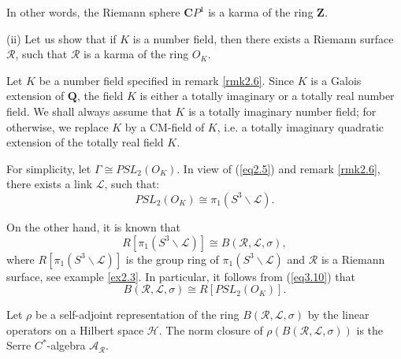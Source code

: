 \documentclass[10pt, reqno]{amsart}
\theoremstyle{definition}
\theoremstyle{remark}
\numberwithin{equation}{section}
\begin{document}
In other words, the Riemann sphere $\mathbf{C}P^1$ is a karma of the ring $\mathbf{Z}$. 






\bigskip
(ii)  Let us show that if $K$ is a number field, then there exists a Riemann surface $\mathscr{R}$, 
such that $\mathscr{R}$ is a karma of the ring $O_K$. 

Let $K$ be a number field specified in remark \ref{rmk2.6}.  Since $K$ is a Galois extension of $\mathbf{Q}$,
the field $K$ is either a totally imaginary or a totally real number field. We shall always assume that $K$ is a totally
imaginary number field;  for otherwise, we replace $K$ by a CM-field of $K$, i.e. a totally imaginary quadratic extension
of the totally real field $K$.  

For simplicity, let $\Gamma\cong PSL_2(O_K)$. In view of  (\ref{eq2.5}) and remark \ref{rmk2.6},   there exists a link $\mathscr{L}$,  
such that: 
\begin{equation}\label{eq3.10} 
PSL_2(O_K)\cong\pi_1(S^3 \backslash\mathscr{L}).
\end{equation}

\bigskip
On the other hand,  it is known that
\begin{equation}\label{eq3.11} 
R[\pi_1(S^3 \backslash\mathscr{L})]\cong B(\mathscr{R}, \mathcal{L}, \sigma), 
\end{equation}
where $R[\pi_1(S^3 \backslash\mathscr{L})]$ is the group ring of $\pi_1(S^3 \backslash\mathscr{L})$ and 
 $\mathscr{R}$ is a Riemann surface, see example \ref{ex2.3}. In particular, it follows from (\ref{eq3.10}) 
 that  
\begin{equation}\label{eq3.12} 
B(\mathscr{R}, \mathcal{L}, \sigma)\cong R[PSL_2(O_K)]. 
\end{equation}


Let $\rho$ be a self-adjoint representation of the ring $B(\mathscr{R}, \mathcal{L}, \sigma)$
by the linear operators on a Hilbert space $\mathscr{H}$. 
The norm closure of $\rho(B(\mathscr{R}, \mathcal{L}, \sigma))$
is the Serre $C^*$-algebra $\mathscr{A}_{\mathscr{R}}$.  
\end{document}
